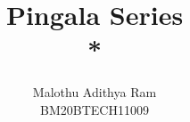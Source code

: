 \documentclass[journal,12pt,twocolumn]{IEEEtran}
\begin{document}
\makeatletter
{}
\makeatother
\let\StandardTheFigure\thefigure
\renewcommand{\thefigure}{\theproblem}
\def\putbox#1#2#3{\makebox[0in][l]{\makebox[#1][l]{}\raisebox{\baselineskip}[0in][0in]{\raisebox{#2}[0in][0in]{#3}}}}
     \def\rightbox#1{\makebox[0in][r]{#1}}
     \def\centbox#1{\makebox[0in]{#1}}
     \def\topbox#1{\raisebox{-\baselineskip}[0in][0in]{#1}}
     \def\midbox#1{\raisebox{-0.5\baselineskip}[0in][0in]{#1}}
\vspace{3cm}
\title{ 
Pingala Series\\* 
}
%
%
%
\author{Malothu Adithya Ram \\ \newline BM20BTECH11009}
% 
%
\end{document}
